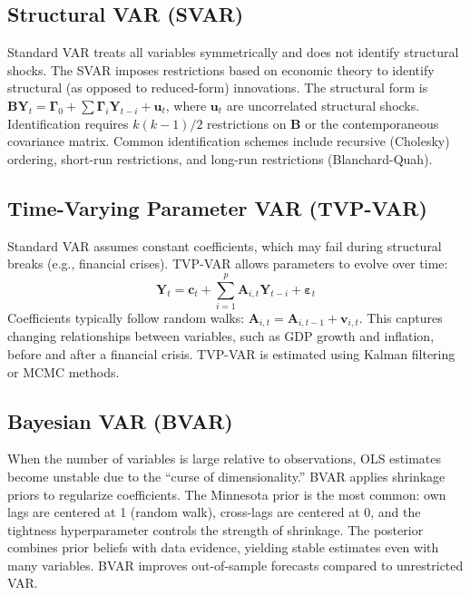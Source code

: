 \documentclass[11pt,a4paper]{article}
\begin{document}
\subsection{Structural VAR (SVAR)}

Standard VAR treats all variables symmetrically and does not identify structural shocks. The SVAR imposes restrictions based on economic theory to identify structural (as opposed to reduced-form) innovations. The structural form is $\mathbf{B} \mathbf{Y}_t = \mathbf{\Gamma}_0 + \sum \mathbf{\Gamma}_i \mathbf{Y}_{t-i} + \mathbf{u}_t$, where $\mathbf{u}_t$ are uncorrelated structural shocks. Identification requires $k(k-1)/2$ restrictions on $\mathbf{B}$ or the contemporaneous covariance matrix. Common identification schemes include recursive (Cholesky) ordering, short-run restrictions, and long-run restrictions (Blanchard-Quah).

\subsection{Time-Varying Parameter VAR (TVP-VAR)}

Standard VAR assumes constant coefficients, which may fail during structural breaks (e.g., financial crises). TVP-VAR allows parameters to evolve over time:
\[
\mathbf{Y}_t = \mathbf{c}_t + \sum_{i=1}^p \mathbf{A}_{i,t} \mathbf{Y}_{t-i} + \boldsymbol{\varepsilon}_t
\]
Coefficients typically follow random walks: $\mathbf{A}_{i,t} = \mathbf{A}_{i,t-1} + \mathbf{v}_{i,t}$. This captures changing relationships between variables, such as GDP growth and inflation, before and after a financial crisis. TVP-VAR is estimated using Kalman filtering or MCMC methods.

\subsection{Bayesian VAR (BVAR)}

When the number of variables is large relative to observations, OLS estimates become unstable due to the ``curse of dimensionality.'' BVAR applies shrinkage priors to regularize coefficients. The Minnesota prior is the most common: own lags are centered at 1 (random walk), cross-lags are centered at 0, and the tightness hyperparameter controls the strength of shrinkage. The posterior combines prior beliefs with data evidence, yielding stable estimates even with many variables. BVAR improves out-of-sample forecasts compared to unrestricted VAR.
\end{document}
